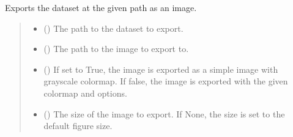 \documentclass[letterpaper,10pt,english]{sphinxmanual}
\begin{document}
\begin{fulllineitems}
\begin{fulllineitems}
\label{\detokenize{_autosummary/HDF5_BLS.wrapper:HDF5_BLS.wrapper.Wrapper.export_image}}
\pysigstartsignatures
\pysiglinewithargsret
{}
{\sphinxparamcomma {}\sphinxparamcomma {}\sphinxparamcomma {}\sphinxparamcomma {}\sphinxparamcomma {}\sphinxparamcomma {}\sphinxparamcomma {}\sphinxparamcomma {}\sphinxparamcomma {}}
{}
\pysigstopsignatures
\sphinxAtStartPar
Exports the dataset at the given path as an image.
\begin{quote}\begin{description}
\begin{itemize}
\item {} 
\sphinxAtStartPar
{} () \textendash{} The path to the dataset to export.

\item {} 
\sphinxAtStartPar
{} () \textendash{} The path to the image to export to.

\item {} 
\sphinxAtStartPar
{} (\sphinxstyleliteralemphasis{\sphinxupquote{, }}) \textendash{} If set to True, the image is exported as a simple image with grayscale colormap. If false, the image is exported with the given colormap and options.

\item {} 
\sphinxAtStartPar
{} (\sphinxstyleliteralemphasis{\sphinxupquote{, }}) \textendash{} The size of the image to export. If None, the size is set to the default figure size.


\end{itemize}
\end{description}
\end{quote}
\end{fulllineitems}
\end{fulllineitems}
\end{document}
